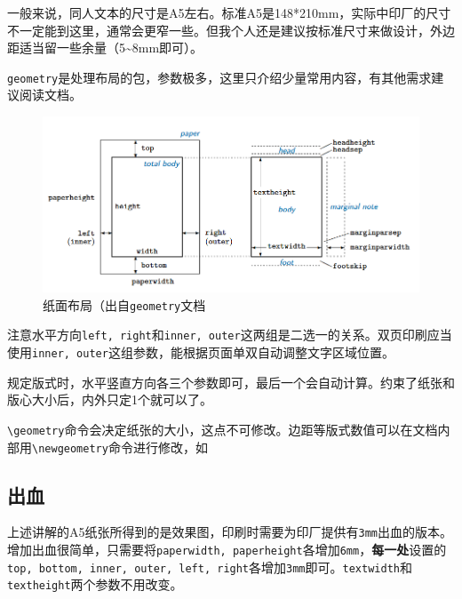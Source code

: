 \documentclass[10pt,openany]{book}
\begin{document}
\begin{sloppypar}
    一般来说，同人文本的尺寸是A5左右。标准A5是148*210mm，实际中印厂的尺寸不一定能到这里，通常会更窄一些。但我个人还是建议按标准尺寸来做设计，外边距适当留一些余量（5\textasciitilde8mm即可）。

    \texttt{geometry}是处理布局的包，参数极多，这里只介绍少量常用内容，有其他需求建议阅读文档。

    \begin{figure}[H]
        \centering
        \includegraphics[width=\linewidth]{data/paper.png}
        \caption{纸面布局（出自\texttt{geometry}文档}
    \end{figure}

    注意水平方向\texttt{left,\ right}和\texttt{inner,\ outer}这两组是二选一的关系。双页印刷应当使用\texttt{inner,\ outer}这组参数，能根据页面单双自动调整文字区域位置。

    

    规定版式时，水平竖直方向各三个参数即可，最后一个会自动计算。约束了纸张和版心大小后，内外只定1个就可以了。

    \texttt{\textbackslash{}geometry}命令会决定纸张的大小，这点不可修改。边距等版式数值可以在文档内部用\texttt{\textbackslash{}newgeometry}命令进行修改，如

    

    \subsection{出血}

    上述讲解的A5纸张所得到的是效果图，印刷时需要为印厂提供有\texttt{3mm}出血的版本。增加出血很简单，只需要将\texttt{paperwidth,\ paperheight}各增加\texttt{6mm}，\textbf{每一处}设置的\texttt{top,\ bottom,\ inner,\ outer,\ left,\ right}各增加\texttt{3mm}即可。\texttt{textwidth}和\texttt{textheight}两个参数不用改变。


\end{sloppypar}
\end{document}
